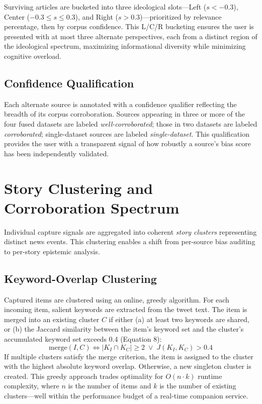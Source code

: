 \documentclass[10pt, conference, compsoc]{IEEEtran}
\begin{document}
Surviving articles are bucketed into three ideological slots—Left ($s < -0.3$), Center ($-0.3 \leq s \leq 0.3$), and Right ($s > 0.3$)—prioritized by relevance percentage, then by corpus confidence. This L/C/R bucketing ensures the user is presented with at most three alternate perspectives, each from a distinct region of the ideological spectrum, maximizing informational diversity while minimizing cognitive overload.

\subsection{Confidence Qualification}
Each alternate source is annotated with a confidence qualifier reflecting the breadth of its corpus corroboration. Sources appearing in three or more of the four fused datasets are labeled \textit{well-corroborated}; those in two datasets are labeled \textit{corroborated}; single-dataset sources are labeled \textit{single-dataset}. This qualification provides the user with a transparent signal of how robustly a source's bias score has been independently validated.


\section{Story Clustering and Corroboration Spectrum}
Individual capture signals are aggregated into coherent \textit{story clusters} representing distinct news events. This clustering enables a shift from per-source bias auditing to per-story epistemic analysis.

\subsection{Keyword-Overlap Clustering}
Captured items are clustered using an online, greedy algorithm. For each incoming item, salient keywords are extracted from the tweet text. The item is merged into an existing cluster $C$ if either (a) at least two keywords are shared, or (b) the Jaccard similarity between the item's keyword set and the cluster's accumulated keyword set exceeds 0.4 (Equation 8):
\begin{equation}
\text{merge}(I, C) \iff |K_I \cap K_C| \geq 2 \;\lor\; J(K_I, K_C) > 0.4
\end{equation}
If multiple clusters satisfy the merge criterion, the item is assigned to the cluster with the highest absolute keyword overlap. Otherwise, a new singleton cluster is created. This greedy approach trades optimality for $O(n \cdot k)$ runtime complexity, where $n$ is the number of items and $k$ is the number of existing clusters—well within the performance budget of a real-time companion service.
\end{document}
